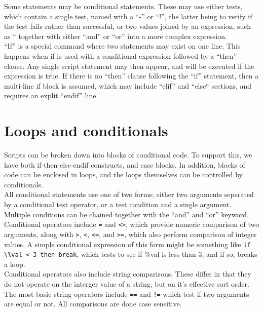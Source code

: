 \documentclass[a4paper,12pt]{article}
\begin{document}
Some statements may be conditional statements.  These may use either tests,
which contain a single test, named with a ``-'' or ``!'', the latter being
to verify if the test fails rather than successful, or two values joined
by an expression, such as ``%
together with either ``and'' or ``or'' into a more complex expression. \\

``If'' is a special command where two statements may exist on one line.  This
happens when if is used with a conditional expression followed by a ``then''
clause.  Any single script statement may then appear, and will be executed
if the expression is true.  If there is no ``then'' clause following the
``if'' statement, then a multi-line if block is assumed, which may include
``elif'' and ``else`` sections, and requires an explit ``endif'' line.  \\

\section{Loops and conditionals}

Scripts can be broken down into blocks of conditional code.  To support 
this, we have both if-then-else-endif constructs, and case blocks.  In 
addition, blocks of code can be enclosed in loops, and the loops
themselves can be controlled by conditionals. \\

All conditional statements use one of two forms; either two arguments 
seperated by a conditional test operator, or a test condition and a single 
argument.  Multiple conditions can be chained together with the ``and'' 
and ``or'' keyword. \\

Conditional operators include \verb|=| and \verb|<>|, which
provide numeric comparison of two arguments, along with \verb|>|,
\verb|<|, \verb|<=|, and \verb|>=|, which also perform comparison of
integer values.  A simple conditional expression of this form might be
something like \verb|if \%val < 3 then break|, which tests to see if \%val is
less than 3, and if so, breaks a loop. \\

Conditional operators also include string comparisons.  These differ in
that they do not operate on the interger value of a string, but on it's
effective sort order.  The most basic string operators include \verb|==|
and \verb|!=| which test if two arguments are equal or not.  All comparisons 
are done case sensitive. \\
\end{document}
